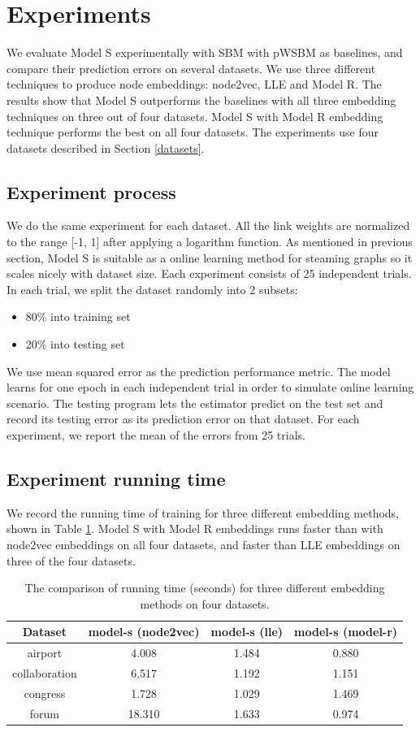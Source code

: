 \documentclass[12pt]{WSUThesis}
\theoremstyle{definition}
\begin{document}
\section{Experiments}
We evaluate Model S experimentally with SBM with pWSBM as baselines,
and compare their prediction errors on several datasets.
We use three different techniques to produce node embeddings: node2vec, LLE and Model R.
The results show that Model S outperforms the baselines with all three embedding techniques on three out of four datasets.
Model S with Model R embedding technique performs the best on all four datasets. The experiments use four datasets described in Section \ref{datasets}.

\subsection{Experiment process}
We do the same experiment for each dataset.
All the link weights are normalized to the range [-1, 1] after applying a logarithm function.
As mentioned in previous section, Model S is suitable as a online learning method for steaming graphs so it scales nicely with dataset size.
Each experiment consists of 25 independent trials.
In each trial, we split the dataset randomly into 2 subsets:
\begin{itemize}
	\item 80\% into training set
	\item 20\% into testing set
\end{itemize}
We use mean squared error as the prediction performance metric.
The model learns for one epoch in each independent trial in order to simulate online learning scenario.
The testing program lets the estimator predict on the test set 
and record its testing error as its prediction error on that dataset.
For each experiment, we report the mean of the errors from 25 trials.

\subsection{Experiment running time}
We record the running time of training for three different embedding methods, shown in Table \ref{tab:time}.
Model S with Model R embeddings runs faster than with node2vec embeddings on all four datasets, and faster than LLE embeddings on three of the four datasets.
\begin{table}[!htb]
	\centering
	\caption{
		The comparison of running time (seconds) for three different embedding methods on four datasets.
	}
	\begin{tabular}{cccc} \hline
		Dataset & model-s (node2vec) & model-s (lle) & model-s (model-r) \\ \hline
		airport & 4.008 & 1.484 & 0.880 \\ \hline
		collaboration & 6.517 & 1.192 & 1.151 \\ \hline
		congress & 1.728 & 1.029 & 1.469 \\ \hline
		forum & 18.310 & 1.633 & 0.974 \\ \hline
	\end{tabular}
	\label{tab:time}
\end{table}
\end{document}
